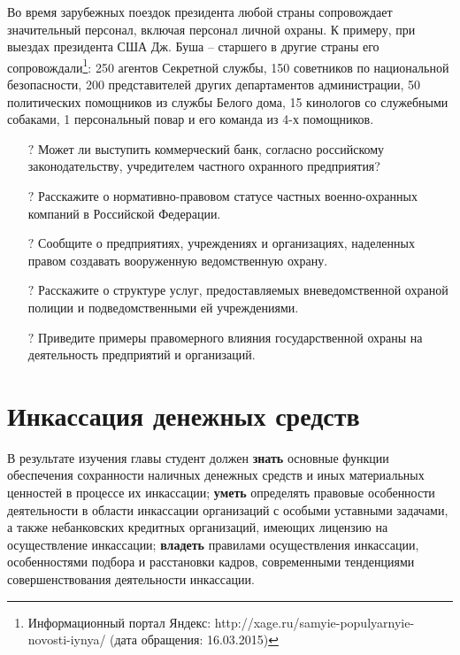 \documentclass[a4paper,12pt,fleqn]{article} %
\begin{document}
Во время зарубежных поездок президента любой страны сопровождает значительный персонал, включая персонал личной охраны. К примеру, при выездах президента США Дж. Буша – старшего в другие страны его сопровождали\footnote{Информационный портал Яндекс: http://xage.ru/samyie-populyarnyie-novosti-iynya/ (дата обращения: 16.03.2015)}: 250 агентов Секретной службы, 150 советников по национальной безопасности, 200 представителей других департаментов администрации, 50 политических помощников из службы Белого дома, 15 кинологов со служебными собаками, 1 персональный повар и его команда из 4-х помощников.\\

\begin{tcolorbox}[colback=blue!40!red!1!,colframe=blue!40!red,enforce breakable,%
	pad at break=1mm, title=Вопросы и задания для самоконтроля]
	\begin{itemize}
		\item[{\color{blue!55!red}\Huge { $ ? $}} ]  Может ли выступить коммерческий банк, согласно российскому законодательству, учредителем частного охранного предприятия?
		\item[{\color{blue!55!red}\Huge {  $ ? $}} ] Расскажите о нормативно-правовом статусе частных военно-охранных компаний в Российской Федерации.
		\item[{\color{blue!55!red}\Huge {  $ ? $}} ] Сообщите о предприятиях, учреждениях и организациях, наделенных правом создавать вооруженную ведомственную охрану.
		\item[{\color{blue!55!red}\Huge {  $ ? $}} ] Расскажите о структуре услуг, предоставляемых вневедомственной охраной полиции и подведомственными ей учреждениями.
		\item[{\color{blue!55!red}\Huge {  $ ? $}} ] Приведите примеры правомерного влияния государственной охраны на деятельность предприятий и организаций.
	\end{itemize}		
\end{tcolorbox}

\section{Инкассация денежных средств}

\begin{tcolorbox}[colback=blue!40!red!10!,colframe=blue!40!red]
В результате изучения главы студент должен \textbf{знать} основные функции обеспечения сохранности наличных денежных средств и иных материальных ценностей в процессе их инкассации; \textbf{уметь} определять правовые особенности деятельности в  области инкассации организаций с особыми уставными задачами, а также небанковских кредитных организаций, имеющих лицензию на осуществление инкассации; \textbf{владеть} правилами осуществления инкассации, особенностями подбора и расстановки кадров, современными тенденциями совершенствования деятельности инкассации.
\end{tcolorbox}
\end{document}
